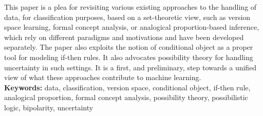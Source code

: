 
This  paper is a plea for revisiting various existing approaches to the handling of data, for classification purposes, based on a set-theoretic view, such as version space learning, formal concept analysis, or analogical proportion-based inference, which rely on different paradigms and motivations and have been developed separately. The paper also exploits the notion of conditional object as a proper tool for 
modeling if-then rules. It also advocates possibility theory for handling uncertainty in such settings. 
It is a first, and preliminary, step towards a unified view of what these approaches contribute to machine learning. \\

{\bf Keywords:} data, classification, version space, conditional object, if-then rule, analogical proportion, formal concept analysis, possibility theory, possibilistic logic, bipolarity, uncertainty 

